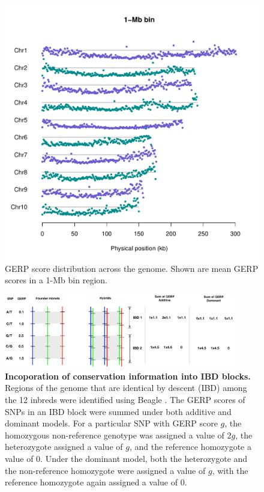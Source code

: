 \documentclass[9pt,twocolumn,twoside]{gsajnl}
\begin{document}
\begin{figure}[htbp]
\centering
\includegraphics[width=\linewidth]{SFig_gerp_dis1m.pdf}
\caption{GERP score distribution across the genome. Shown are mean GERP scores in a 1-Mb bin region.}
\label{fig:dis1m}
\end{figure}

\begin{figure}[htbp]
\includegraphics[width=0.9\textwidth]{SFig_gerpIBD.pdf}
\caption{
\textbf{Incoporation of conservation information into IBD blocks.}
Regions of the genome that are identical by descent (IBD) among the 12 inbreds were identified using Beagle \citep{Browning2009}.  The GERP scores of SNPs in an IBD block were summed under both additive and dominant models. For a particular SNP with GERP score $g$, the homozygous non-reference genotype was assigned a value of $2g$, the heterozygote assigned a value of $g$, and the reference homozygote a value of 0.  Under the dominant model, both the heterozygote and the non-reference homozygote were assigned a value of $g$, with the reference homozygote again assigned a value of 0.}
\label{fig:gerpibd}
\end{figure}
\end{document}
